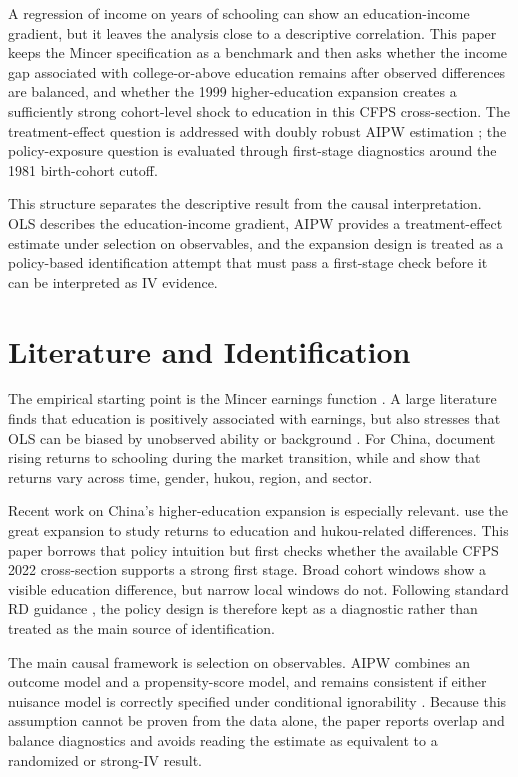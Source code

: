 \documentclass[12pt]{article}
\begin{document}
A regression of income on years of schooling can show an education-income gradient, but it leaves the analysis close to a descriptive correlation. This paper keeps the Mincer specification as a benchmark and then asks whether the income gap associated with college-or-above education remains after observed differences are balanced, and whether the 1999 higher-education expansion creates a sufficiently strong cohort-level shock to education in this CFPS cross-section. The treatment-effect question is addressed with doubly robust AIPW estimation \citep{hirano2003efficient, bang2005doubly}; the policy-exposure question is evaluated through first-stage diagnostics around the 1981 birth-cohort cutoff.

This structure separates the descriptive result from the causal interpretation. OLS describes the education-income gradient, AIPW provides a treatment-effect estimate under selection on observables, and the expansion design is treated as a policy-based identification attempt that must pass a first-stage check before it can be interpreted as IV evidence.

\section{Literature and Identification}

The empirical starting point is the Mincer earnings function \citep{mincer1974schooling}. A large literature finds that education is positively associated with earnings, but also stresses that OLS can be biased by unobserved ability or background \citep{card1999causal}. For China, \citet{zhang2005urban} document rising returns to schooling during the market transition, while \citet{asadullah2020changing} and \citet{ma2021meta} show that returns vary across time, gender, hukou, region, and sector.

Recent work on China's higher-education expansion is especially relevant. \citet{huang2022expansion} use the great expansion to study returns to education and hukou-related differences. This paper borrows that policy intuition but first checks whether the available CFPS 2022 cross-section supports a strong first stage. Broad cohort windows show a visible education difference, but narrow local windows do not. Following standard RD guidance \citep{imbens2008rd, lee2010rd}, the policy design is therefore kept as a diagnostic rather than treated as the main source of identification.

The main causal framework is selection on observables. AIPW combines an outcome model and a propensity-score model, and remains consistent if either nuisance model is correctly specified under conditional ignorability \citep{bang2005doubly}. Because this assumption cannot be proven from the data alone, the paper reports overlap and balance diagnostics and avoids reading the estimate as equivalent to a randomized or strong-IV result.
\end{document}
